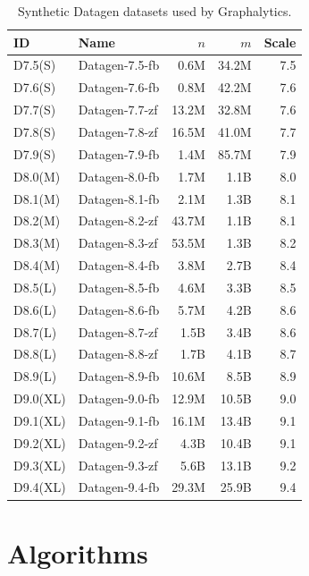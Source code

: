 \begin{table}[t!]
\caption{Synthetic Datagen datasets used by Graphalytics.}
\label{tab:datagen-datasets}
\centering
\begin{tabular}{|l|l|r|r|r|}
\hline
\textbf{ID} & \textbf{Name} & $n$ & $m$ & \textbf{Scale} \\
\hline \hline
D7.5(S) & Datagen-7.5-fb & 0.6M & 34.2M & 7.5 \\ \hline
D7.6(S) & Datagen-7.6-fb & 0.8M & 42.2M & 7.6 \\ \hline
D7.7(S) & Datagen-7.7-zf & 13.2M & 32.8M & 7.6 \\ \hline
D7.8(S) & Datagen-7.8-zf & 16.5M & 41.0M & 7.7 \\ \hline
D7.9(S) & Datagen-7.9-fb & 1.4M & 85.7M & 7.9 \\ \hline
D8.0(M) & Datagen-8.0-fb & 1.7M & 1.1B & 8.0 \\ \hline
D8.1(M) & Datagen-8.1-fb & 2.1M & 1.3B & 8.1 \\ \hline
D8.2(M) & Datagen-8.2-zf & 43.7M & 1.1B & 8.1 \\ \hline
D8.3(M) & Datagen-8.3-zf & 53.5M & 1.3B & 8.2 \\ \hline
D8.4(M) & Datagen-8.4-fb & 3.8M & 2.7B & 8.4 \\ \hline
D8.5(L) & Datagen-8.5-fb & 4.6M & 3.3B & 8.5 \\ \hline
D8.6(L) & Datagen-8.6-fb & 5.7M & 4.2B & 8.6 \\ \hline
D8.7(L) & Datagen-8.7-zf & 1.5B & 3.4B & 8.6 \\ \hline
D8.8(L) & Datagen-8.8-zf & 1.7B & 4.1B & 8.7 \\ \hline
D8.9(L) & Datagen-8.9-fb & 10.6M & 8.5B & 8.9 \\ \hline
D9.0(XL) & Datagen-9.0-fb & 12.9M & 10.5B & 9.0 \\ \hline
D9.1(XL) & Datagen-9.1-fb & 16.1M & 13.4B & 9.1 \\ \hline
D9.2(XL) & Datagen-9.2-zf & 4.3B & 10.4B & 9.1 \\ \hline
D9.3(XL) & Datagen-9.3-zf & 5.6B & 13.1B & 9.2 \\ \hline
D9.4(XL) & Datagen-9.4-fb & 29.3M & 25.9B & 9.4 \\ \hline
\end{tabular}
\end{table}



\section{Algorithms}
\label{sec:definition_algorithms}

